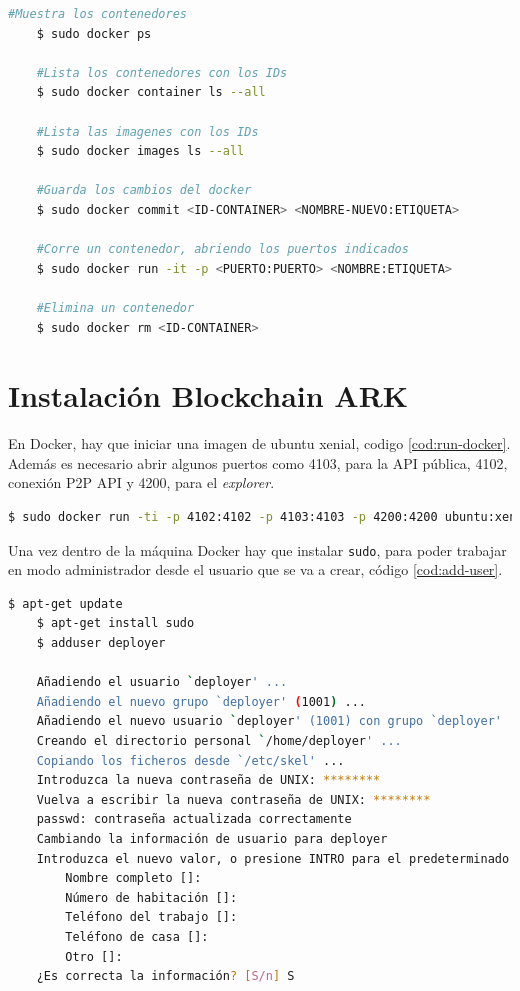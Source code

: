 \begin{lstlisting}[language=Bash,caption=Comandos útiles de Docker, label=cod:cm-docker]
	#Muestra los contenedores
	$ sudo docker ps

	#Lista los contenedores con los IDs
	$ sudo docker container ls --all

	#Lista las imagenes con los IDs
	$ sudo docker images ls --all 

	#Guarda los cambios del docker
	$ sudo docker commit <ID-CONTAINER> <NOMBRE-NUEVO:ETIQUETA>

	#Corre un contenedor, abriendo los puertos indicados
	$ sudo docker run -it -p <PUERTO:PUERTO> <NOMBRE:ETIQUETA>

	#Elimina un contenedor
	$ sudo docker rm <ID-CONTAINER>
\end{lstlisting}

\section{Instalación Blockchain ARK}

En Docker, hay que iniciar una imagen de ubuntu xenial, codigo \ref{cod:run-docker}. Además es necesario abrir algunos puertos como 4103, para la API pública, 4102, conexión P2P API y 4200, para el \textit{explorer}.\\

\begin{lstlisting}[language=Bash,caption=Instalación \textit{blockchain}. Parte I, label=cod:run-docker, style=Consola]
	$ sudo docker run -ti -p 4102:4102 -p 4103:4103 -p 4200:4200 ubuntu:xenial
\end{lstlisting}

Una vez dentro de la máquina Docker hay que instalar \texttt{sudo}, para poder trabajar en modo administrador desde el usuario que se va a crear, código \ref{cod:add-user}.\\

\begin{lstlisting}[language=Bash,caption=Instalación \textit{blockchain}. Parte II, label=cod:add-user, style=Consola]
	$ apt-get update
	$ apt-get install sudo
	$ adduser deployer

	Añadiendo el usuario `deployer' ...
	Añadiendo el nuevo grupo `deployer' (1001) ...
	Añadiendo el nuevo usuario `deployer' (1001) con grupo `deployer' ...
	Creando el directorio personal `/home/deployer' ...
	Copiando los ficheros desde `/etc/skel' ...
	Introduzca la nueva contraseña de UNIX: ********
	Vuelva a escribir la nueva contraseña de UNIX: ********
	passwd: contraseña actualizada correctamente
	Cambiando la información de usuario para deployer
	Introduzca el nuevo valor, o presione INTRO para el predeterminado
		Nombre completo []: 
		Número de habitación []: 
		Teléfono del trabajo []: 
		Teléfono de casa []: 
		Otro []: 
	¿Es correcta la información? [S/n] S
\end{lstlisting}

